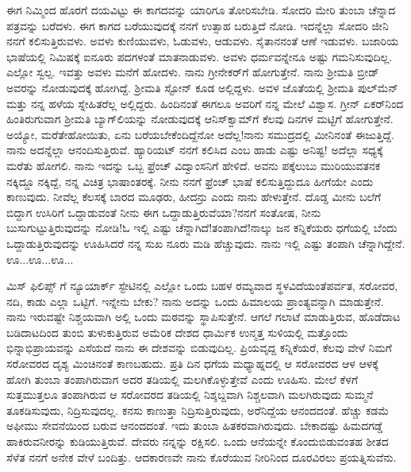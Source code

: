 ಈಗ ನಿಮ್ಮಿಂದ ಹೊರಗೆ ದಯವಿಟ್ಟು ಈ ಕಾಗದವನ್ನು ಯಾರಿಗೂ ತೋರಿಸಬೇಡಿ. ಸೋದರಿ ಮೇರಿ ತುಂಬಾ ಚೆನ್ನಾದ ಪತ್ರವನ್ನು ಬರೆದಳು. ಈಗ ಕಾಗದ ಬರೆಯು\break ವುದಕ್ಕೆ ನನಗೆ ಉತ್ಸಾಹ ಬರುತ್ತಿದೆ ನೋಡಿ. ಇದನ್ನೆಲ್ಲಾ ಸೋದರಿ ಜೀನಿ ನನಗೆ ಕಲಿಸು\break ತ್ತಿರುವಳು. ಅವಳು ಕುಣಿಯುವಳು, ಓಡುವಳು, ಆಡುವಳು. ಸೈತಾನನಂತೆ ಆಣೆ ಇಡುವಳು. ಬಜಾರಿಯ ಭಾಷೆಯಲ್ಲಿ ನಿಮಿಷಕ್ಕೆ ಐನೂರು ಪದಗಳಂತೆ ಮಾತನಾಡುವಳು. ಅವಳು ಧರ್ಮವನ್ನೇನೂ ಅಷ್ಟು ಗಮನಿಸುವುದಿಲ್ಲ. ಎಲ್ಲೋ ಸ್ವಲ್ಪ. ಇವತ್ತು ಅವಳು ಮನೆಗೆ ಹೋದಳು. ನಾನು ಗ್ರೀನೇಕರ್‌ಗೆ ಹೋಗುತ್ತೇನೆ. ನಾನು ಶ‍್ರೀಮತಿ ಬ್ರೀಡ್ ಅವರನ್ನು ನೋಡುವುದಕ್ಕೆ ಹೋಗಿದ್ದೆ. ಶ‍್ರೀಮತಿ ಸ್ಟೋನ್ ಕೂಡ ಅಲ್ಲಿದ್ದಳು. ಅವಳ ಜೊತೆಯಲ್ಲಿ ಶ‍್ರೀಮತಿ ಪುಲ್‌ಮೆನ್ ಮತ್ತು ನನ್ನ ಹಳೆಯ ಸ್ನೇಹಿತರೆಲ್ಲ ಅಲ್ಲಿದ್ದರು. ಹಿಂದಿನಂತೆ ಈಗಲೂ ಅವರಿಗೆ ನನ್ನ ಮೇಲೆ ವಿಶ್ವಾಸ. ಗ್ರೀನ್ ಏಕರ್‌ನಿಂದ ಹಿಂತಿರುಗುವಾಗ ಶ‍್ರೀಮತಿ ಬ್ಯಾಗ್‌ಲಿಯನ್ನು ನೋಡುವುದಕ್ಕೆ ಆನಿಸ್‌ಕ್ವಾಮ್‌ಗೆ ಕೆಲವು ದಿನಗಳ ಮಟ್ಟಿಗೆ ಹೋಗುತ್ತೇನೆ. ಅಯ್ಯೋ, ಮರೆತೇಹೋಯಿತು, ಏನು ಬರೆಯಬೇಕೆಂದಿದ್ದೆನೋ ಅದೆಲ್ಲ!ನಾನು ಸಮುದ್ರದಲ್ಲಿ ಮೀನಿನಂತೆ ಈಜುತ್ತಿದ್ದೆ. ನಾನು ಅದನ್ನೆಲ್ಲಾ ಆನಂದಿಸುತ್ತಿರುವೆ. ಹ್ಯಾರಿಯಟ್ ನನಗೆ ಕಲಿಸಿದ  ಎಂಬ ಹಾಡು ಎಷ್ಟು ಅನಿಷ್ಟ! ಅದೆಲ್ಲಾ ಸಧ್ಯಕ್ಕೆ ಮರೆತು ಹೋಗಲಿ. ನಾನು ಇದನ್ನು ಒಬ್ಬ ಫ್ರೆಂಚ್ ವಿದ್ವಾಂಸನಿಗೆ ಹೇಳಿದೆ. ಅವನು ಪಕ್ಕೆಲುಬು ಮುರಿಯುವತನಕ ನಕ್ಕಿದ್ದೂ ನಕ್ಕಿದ್ದೆ, ನನ್ನ ವಿಚಿತ್ರ ಭಾಷಾಂತರಕ್ಕೆ. ನೀನು ನನಗೆ ಫ್ರೆಂಚ್ ಭಾಷೆ ಕಲಿಸುತ್ತಿದ್ದುದೂ ಹೀಗೆಯೇ ಎಂದು ಕಾಣುವುದು. ನೀವೆಲ್ಲ ಕೆಲಸಕ್ಕೆ ಬಾರದ ಮೂಢರು, ಹೀದನ್ರು ಎಂದು ನಾನು ಹೇಳುತ್ತೇನೆ. ದೊಡ್ಡ ಮೀನು ಬಲೆಗೆ ಬಿದ್ದಾಗ ಉಸಿರಿಗೆ ಒದ್ದಾಡುವಂತೆ ನೀನು ಈಗ ಒದ್ದಾಡುತ್ತಿರುವೆಯಾ?ನನಗೆ ಸಂತೋಷ, ನೀನು ಬುಸುಗುಟ್ಟುತ್ತಿರುವುದನ್ನು ನೋಡಿ!ಓ ಇಲ್ಲಿ ಎಷ್ಟು ಚೆನ್ನಾಗಿದೆ!ತಂಪಾಗಿದೆ!ನಾಲ್ಕು ಜನ ಕನ್ನಿಕೆಯರು ಧಗೆಯಲ್ಲಿ ಬೆಂದು ಒದ್ದಾಡುತ್ತಿರುವುದನ್ನು ಊಹಿಸಿದರೆ ನನ್ನ ಸುಖ ನೂರು ಮಡಿ ಹೆಚ್ಚುವುದು. ನಾನು ಇಲ್ಲಿ ಎಷ್ಟು ತಂಪಾಗಿ ಚೆನ್ನಾಗಿದ್ದೇನೆ. ಊ...ಊ...ಊ...

ಮಿಸ್ ಫಿಲಿಪ್ಸ್ ಗೆ ನ್ಯೂಯಾರ್ಕ್ ಸ್ಟೇಟಿನಲ್ಲಿ ಎಲ್ಲೋ ಒಂದು ಬಹಳ ರಮ್ಯವಾದ ಸ್ಥಳವಿದೆಯಂತೆ\enginline{-}ಪರ್ವತ, ಸರೋವರ, ನದಿ, ಕಾಡು ಎಲ್ಲಾ ಒಟ್ಟಿಗೆ. ಇನ್ನೇನು ಬೇಕು? ನಾನು ಅದನ್ನು ಒಂದು ಹಿಮಾಲಯ ಪ್ರಾಂತ್ಯವನ್ನಾಗಿ ಮಾಡುತ್ತೇನೆ. ನಾನು ಇರುವಷ್ಟೇ ನಿಶ್ಚಯವಾಗಿ ಅಲ್ಲಿ ಒಂದು ಮಠವನ್ನು ಸ್ಥಾಪಿಸುತ್ತೇನೆ. ಆಗಲೆ ಗಲಾಟೆ ಮಾಡುತ್ತಿರುವ, ಹೊಡೆದಾಟ ಬಡಿದಾಟದಿಂದ ತುಂಬಿ ತುಳುಕುತ್ತಿರುವ ಅಮೆರಿಕ ದೇಶದ ಧಾರ್ಮಿಕ ಉನ್ಮತ್ತ ಸುಳಿಯಲ್ಲಿ ಮತ್ತೊಂದು ಭಿನ್ನಾಭಿಪ್ರಾಯವನ್ನು ಎಸೆಯದೆ ನಾನು ಈ ದೇಶವನ್ನು ಬಿಡುವುದಿಲ್ಲ. ಪ್ರಿಯವೃದ್ದ ಕನ್ನಿಕೆಯರೆ, ಕೆಲವು ವೇಳೆ ನಿಮಗೆ ಸರೋವರದ ದೃಶ್ಯ ಮಿಂಚಿನಂತೆ ಕಾಣಬಹುದು. ಪ್ರತಿ ದಿನ ಧಗೆಯ ಮಧ್ಯಾಹ್ನದಲ್ಲಿ ಆ ಸರೋವರದ ಆಳ ಆಳಕ್ಕೆ ಹೋಗಿ ತುಂಬಾ ತಂಪಾಗಿರುವಾಗ ಅದರ ತಡಿಯಲ್ಲಿ ಮಲಗಿಕೊಳ್ಳುತ್ತೇವೆ ಎಂದು ಊಹಿಸು. ಮೇಲೆ ಕೆಳಗೆ ಸುತ್ತಮುತ್ತಲೂ ತಂಪಾಗಿರುವ ಆ ಸರೋವರದ ತಡಿಯಲ್ಲಿ ನಿಶ್ಶಬ್ದವಾಗಿ ನಿಶ್ಚಲವಾಗಿ ಮಲಗಿರುವುದು\enginline{-} ಸುಮ್ಮನೆ ತೂಕಡಿಸುವುದು, ನಿದ್ರಿಸುವುದಲ್ಲ. ಕನಸು ಕಾಣುತ್ತಾ ನಿದ್ರಿಸುತ್ತಿರುವುದು, ಅರೆನಿದ್ದೆಯ ಆನಂದದಂತೆ. ಹೆಚ್ಚು ಕಡಮೆ ಅಫೀಮು ಸೇವನೆಯಿಂದ ಬರುವ ಆನಂದದಂತೆ. ಇದು ತುಂಬಾ ಹಿತಕರವಾಗಿರುವುದು. ಬೇಕಾದಷ್ಟು ಹಿಮದಗಡ್ಡೆ ಹಾಕಿರುವನೀರನ್ನು ಕುಡಿಯುತ್ತಿರುವೆ. ದೇವರು ನನ್ನನ್ನು ರಕ್ಷಿಸಲಿ. ಒಂದು ಆನೆಯನ್ನೇ ಕೊಂದುಬಿಡುವಂತಹ ಶೀತದ ಸೆಳೆತ ನನಗೆ ಅನೇಕ ವೇಳೆ ಬಂದಿತ್ತು. ಆದಕಾರಣವೇ ನಾನು ಕೊರೆಯುವ ನೀರಿನಿಂದ ದೂರವಿರಲು ಪ್ರಯತ್ನಿಸುವೆನು.

